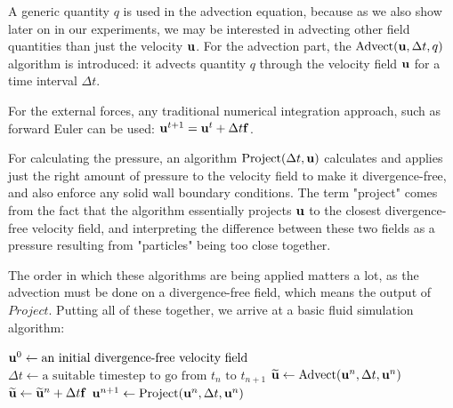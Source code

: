 A generic quantity $q$ is used in the advection equation, because as we also
show later on in our experiments, we may be interested in advecting other field
quantities than just the velocity $\vb{u}$. For the advection part, the
$\text{Advect}(\vb{u}, \Delta t, q)$ algorithm is introduced: it advects
quantity $q$ through the velocity field $\vb{u}$ for a time interval $\Delta t$. 

For the external forces, any traditional numerical integration approach, such as
forward Euler can be used: $\vb{u}^{t+1} = \vb{u}^t + \Delta t \vb{f}$.

For calculating the pressure, an algorithm $\text{Project}(\Delta t, \vb{u})$
calculates and applies just the right amount of pressure to the velocity field
to make it divergence-free, and also enforce any solid wall boundary
conditions. The term "project" comes from the fact that the algorithm
essentially projects $\vb{u}$ to the closest divergence-free velocity field, and
interpreting the difference between these two fields as a pressure resulting
from "particles" being too close together. 

The order in which these algorithms are being applied matters a lot, as the
advection must be done on a divergence-free field, which means the output of
$Project$. Putting all of these together, we arrive at a basic fluid simulation
algorithm:

\begin{algorithmic}
    \State $\vb{u}^0 \gets \text{an initial divergence-free velocity field}$
        \State $\Delta t 
            \gets \text{a suitable timestep to go from $t_n$ to $t_{n+1}$}$
        \State $\widetilde{\vb{u}} 
            \gets \text{Advect}(\vb{u}^n,\Delta t, \vb{u}^n)$
        \State $\widetilde{\vb{u}} 
            \gets \widetilde{\vb{u}}^n + \Delta t \vb{f}$
        \State $\vb{u}^{n+1}
            \gets \text{Project}(\vb{u}^n,\Delta t, \vb{u}^n)$
            \EndFor {}
\end{algorithmic}




